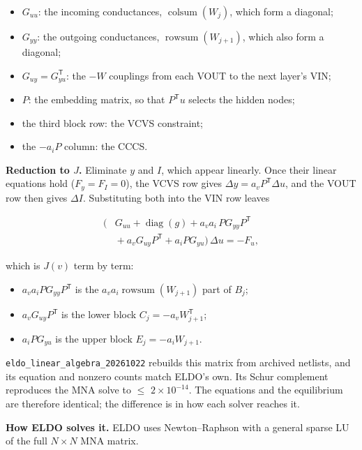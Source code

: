 \documentclass[11pt,a4paper]{article}
\begin{document}
\begin{itemize}
\item $G_{uu}$: the incoming conductances, $\operatorname{colsum}(W_j)$, which form a
diagonal;
\item $G_{yy}$: the outgoing conductances, $\operatorname{rowsum}(W_{j+1})$, which also form a
diagonal;
\item $G_{uy}=G_{yu}^{\mathsf T}$: the $-W$ couplings from each VOUT to the next
layer's VIN;
\item $P$: the embedding matrix, so that $P^{\mathsf T}u$ selects the hidden nodes;
\item the third block row: the VCVS constraint;
\item the $-a_iP$ column: the CCCS.
\end{itemize}

\textbf{Reduction to $J$.} Eliminate $y$ and $I$, which appear linearly. Once their linear equations hold
($F_y=F_I=0$), the VCVS row gives $\Delta y=a_vP^{\mathsf T}\Delta u$, and the VOUT row then gives $\Delta I$.
Substituting both into the VIN row leaves

\[
\begin{aligned}
\big(&G_{uu} + \operatorname{diag}(g) + a_v a_i\,P G_{yy} P^{\mathsf T}\\
&{}+ a_v G_{uy} P^{\mathsf T} + a_i P G_{yu}\big)\,\Delta u = -F_u ,
\end{aligned}
\]

which is $J(v)$ term by term:

\begin{itemize}
\item $a_va_iPG_{yy}P^{\mathsf T}$ is the $a_va_i\operatorname{rowsum}(W_{j+1})$ part of
$B_{j}$;
\item $a_vG_{uy}P^{\mathsf T}$ is the lower block $C_j=-a_vW_{j+1}^{\mathsf T}$;
\item $a_iPG_{yu}$ is the upper block $E_j=-a_iW_{j+1}$.
\end{itemize}

\nolinkurl{eldo_linear_algebra_20261022} rebuilds this matrix from archived netlists,
and its equation and nonzero counts match ELDO's own. Its Schur complement reproduces
the MNA solve to \ensuremath{\leq} $2\times 10^{-14}$. The equations and the equilibrium
are therefore identical; the difference is in how each solver reaches it.

\textbf{How ELDO solves it.} ELDO uses Newton--Raphson with a general sparse LU of the
full $N\times N$ MNA matrix.
\end{document}
